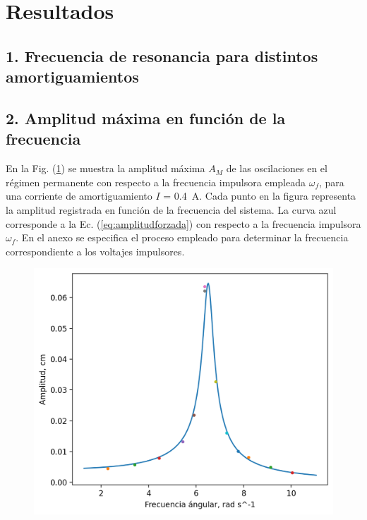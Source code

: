 \section*{Resultados}
\subsection*{1. Frecuencia de resonancia para distintos amortiguamientos}

\vspace{1cm}



\subsection*{2. Amplitud máxima en función de la frecuencia}

En la Fig. (\ref{fig:amplitudfrecuencia}) se muestra la amplitud máxima $A_M$ de las 
oscilaciones en el régimen permanente con respecto a la frecuencia impulsora empleada 
$\omega_f$, para una corriente de amortiguamiento $I$ = \qty{0,4}{\ampere}. Cada punto en la
figura representa la amplitud registrada en función de la frecuencia del sistema. La curva 
azul corresponde a la Ec. (\ref{eq:amplitudforzada}) con respecto a la frecuencia impulsora
$\omega_f$. En el anexo se especifica el proceso empleado para determinar la frecuencia correspondiente a los voltajes impulsores.
\begin{figure}[H]
	\centering
	\includegraphics[width=\linewidth]{results/res/reso.png}
	\label{fig:amplitudfrecuencia}
\end{figure}